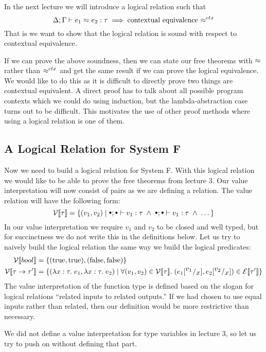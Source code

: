 In the next lecture we will introduce a logical relation such that
\[
  \Delta ; \Gamma \vdash e_1 \approx^{} e_2 : \tau \implies \text{contextual equivalence \ensuremath{ \approx^{ctx} }} 
\]
That is we want to show that the logical relation is sound with respect to contextual equivalence. 

If we can prove the above soundness, then we can state our free theorems with $ \approx^{} $ rather than $ \approx^{ctx} $ and get the same result if we can prove the logical equivalence. We would like to do this as it is difficult to directly prove two things are contextual equivalent. A direct proof has to talk about all possible program contexts which we could do using induction, but the lambda-abstraction case turns out to be difficult. This motivates the use of other proof methods where using a logical relation is one of them.

\subsection*{A Logical Relation for System F}
Now we need to build a logical relation for System F. With this logical relation we would like to be able to prove the free theorems from lecture 3. Our value interpretation will now consist of pairs as we are defining a relation. The value relation will have the following form:
\[
  \vpred{\tau} = \{(v_1,v_2) \vbar 
                        \mtenv ; \mtenv \vdash v_1 : \tau \pand 
                        \mtenv ; \mtenv \vdash v_1 : \tau \pand \dots \}
\]
In our value interpretation we require $v_1$ and $v_2$ to be closed and well typed, but for succinctness we do not write this in the definitions below. 
Let us try to naively build the logical relation the same way we build the logical predicates:
\begin{align*}
  \mathcal{V}\llbracket bool \rrbracket                 & = \{ (\text{true},\text{true}), (\text{false},\text{false}) \} \\
  \mathcal{V}\llbracket  \tau \rightarrow \tau' \rrbracket & = \{ (\lambda x : \tau . \; e_1,\lambda x : \tau . \; e_2) \; | \; \forall (v_1,v_2) \in \mathcal{V}\llbracket \tau \rrbracket. \; (e_1[^{\textstyle v_1}/_{\textstyle x}],e_2[^{\textstyle v_2}/_{\textstyle x}]) \in \mathcal{E}\llbracket \tau' \rrbracket \}
\end{align*}
The value interpretation of the function type is defined based on the slogan for logical relations ``related inputs to related outputs.'' If we had chosen to use equal inputs rather than related, then our definition would be more restrictive than necessary.

We did not define a value interpretation for type variables in lecture 3, so let us try to push on without defining that part.

